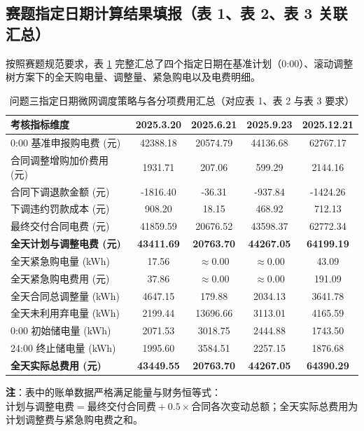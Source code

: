 \documentclass[withoutpreface]{cumcmthesis}
\begin{document}
\subsection{赛题指定日期计算结果填报（表 1、表 2、表 3 关联汇总）}
按照赛题规范要求，表 \ref{tab:q3_selected_dates} 完整汇总了四个指定日期在基准计划（0:00）、滚动调整树方案下的全天购电量、调整量、紧急购电以及电费明细。

\begin{table}[htbp]
\centering
\renewcommand{\arraystretch}{1.2}
\setlength{\tabcolsep}{4.5pt}
\caption{问题三指定日期微网调度策略与各分项费用汇总（对应表 1、表 2 与表 3 要求）}
\label{tab:q3_selected_dates}
\begin{tabular*}{\textwidth}{@{\extracolsep{\fill}}lcccc@{}}
\toprule[1.5pt]
考核指标维度 & 2025.3.20 & 2025.6.21 & 2025.9.23 & 2025.12.21 \\
\midrule[1pt]
0:00 基准申报购电费 (元)   & 42388.18 & 20574.79 & 44136.68 & 62767.17 \\
合同调整增购加价费用 (元)   & 1931.71  & 207.06   & 599.29   & 2144.16  \\
合同下调退款金额 (元)      & -1816.40 & -36.31   & -937.84  & -1424.26 \\
下调违约罚款成本 (元)      & 908.20   & 18.15    & 468.92   & 712.13   \\
最终交付合同电费 (元)      & 41859.59 & 20676.52 & 43598.37 & 62772.34 \\
\textbf{全天计划与调整电费 (元)} & \textbf{43411.69} & \textbf{20763.70} & \textbf{44267.05} & \textbf{64199.19} \\
\midrule[0.5pt]
全天紧急购电量 (kWh)       & 17.56    & $\approx 0.00$ & $\approx 0.00$ & 43.09 \\
全天紧急购电费用 (元)      & 37.86    & $\approx 0.00$ & $\approx 0.00$ & 191.09 \\
全天合同总调整量 (kWh)     & 4647.15  & 179.88   & 2034.13  & 3641.78 \\
全天未利用弃电量 (kWh)     & 2199.44  & 13696.66 & 3113.01  & 4165.59 \\
\midrule[0.5pt]
0:00 初始储电量 (kWh)      & 2071.53  & 3018.75  & 2444.88  & 1743.50 \\
24:00 终止储电量 (kWh)     & 1995.60  & 3584.51  & 2257.15  & 1876.68 \\
\textbf{全天实际总费用 (元)} & \textbf{43449.55} & \textbf{20763.70} & \textbf{44267.05} & \textbf{64390.29} \\
\bottomrule[1.5pt]
\end{tabular*}
\begin{tablenotes}
    \footnotesize
    \item \textbf{注}：表中的账单数据严格满足能量与财务恒等式：$\text{计划与调整电费} = \text{最终交付合同费} + 0.5 \times \text{合同各次变动总额}$；全天实际总费用为计划调整费与紧急购电费之和。
\end{tablenotes}
\end{table}
\end{document}
